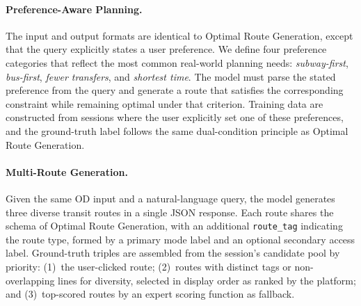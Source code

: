 \documentclass{article}
\begin{document}
\paragraph{Preference-Aware Planning.}
The input and output formats are identical to Optimal Route Generation, except that the query explicitly states a user preference. We define four preference categories that reflect the most common real-world planning needs: \textit{subway-first}, \textit{bus-first}, \textit{fewer transfers}, and \textit{shortest time}. The model must parse the stated preference from the query and generate a route that satisfies the corresponding constraint while remaining optimal under that criterion. Training data are constructed from sessions where the user explicitly set one of these preferences, and the ground-truth label follows the same dual-condition principle as Optimal Route Generation.

\paragraph{Multi-Route Generation.}
Given the same OD input and a natural-language query, the model generates three diverse transit routes in a single JSON response. Each route shares the schema of Optimal Route Generation, with an additional \texttt{route\_tag} indicating the route type, formed by a primary mode label and an optional secondary access label. Ground-truth triples are assembled from the session's candidate pool by priority: (1)~the user-clicked route; (2)~routes with distinct tags or non-overlapping lines for diversity, selected in display order as ranked by the platform; and (3)~top-scored routes by an expert scoring function as fallback.
\endgroup
\end{document}
